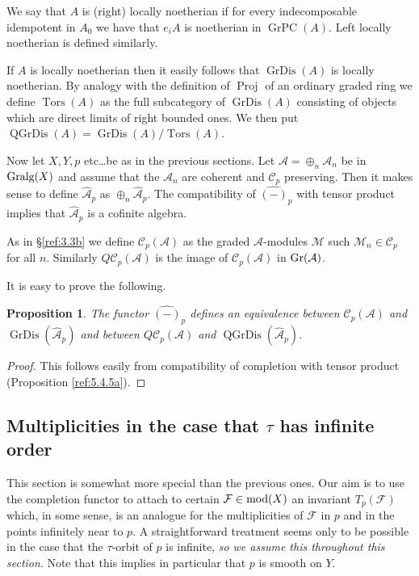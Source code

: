 \documentclass{amsproc}
\def\Ascr{{\mathcal A}}
\def\Cscr{{\mathcal C}}
\def\Fscr{{\mathcal F}}
\def\Mscr{{\mathcal M}}
\def\mod{\mathop{\text{mod}}}
\def\Gr{\mathop{\text{Gr}}}
\def\Gralg{\mathop{\text{Gralg}}}
\def\Tors{\operatorname{Tors}}
\def\Proj{\operatorname {Proj}}
\def\Tors{\operatorname {Tors}}
\let\oldtext\text
\def\text#1{\oldtext{\upshape #1}}
\DeclareMathOperator{\GrPC}{GrPC}
\DeclareMathOperator{\GrDis}{GrDis}
\DeclareMathOperator{\QGrDis}{QGrDis}
\newtheorem{propositions}[lemmas]{Proposition}
\theoremstyle{definition}
\theoremstyle{remark}
\numberwithin{equation}{section}
\numberwithin{table}{section}
\numberwithin{figure}{section}
\def\Gr{\mathop{\text{Gr}}}
\begin{document}
We say that $A$ is (right) locally noetherian if for every indecomposable
idempotent in $A_0$ we have that $e_iA$ is noetherian in $\GrPC(A)$. Left
locally noetherian is defined similarly.

If $A$ is locally
noetherian then it easily follows that $\GrDis(A)$ is locally noetherian.
 By analogy with the definition
of $\Proj$ of an ordinary graded ring we define $\Tors(A)$ as the full
subcategory of $\GrDis(A)$ consisting of objects which are direct
limits of right bounded ones. We then put
$\QGrDis(A)=\GrDis(A)/\Tors(A)$. 


Now let $X,Y,p$ etc\dots be as in the previous sections. Let
$\Ascr=\oplus_n \Ascr_n$ be  in $\Gralg(X)$ and
assume that the $\Ascr_n$ are coherent and $\Cscr_p$ preserving. Then
it makes sense to define $\hat{\Ascr}_p$ as $\oplus_n
\hat{\Ascr}_p$. The compatibility of $\hat{(-)}_p$ with tensor product
implies that $\hat{\Ascr}_p$ is a cofinite algebra.

As in \S\ref{ref:3.3b} we define $\Cscr_{p}(\Ascr)$ as the graded
$\Ascr$-modules $\Mscr$ such $\Mscr_n\in\Cscr_p$ for all $n$.
Similarly $Q\Cscr_p(\Ascr)$ is the image of $\Cscr_p(\Ascr)$ in
$\Gr(\Ascr)$.

 It is easy to prove the following. 
\begin{propositions} 
\label{ref:5.6.2a}
The functor $\hat{(-)}_p$ defines an  equivalence
  between $\Cscr_p(\Ascr)$ and $\GrDis(\hat{\Ascr}_p)$ and between
  $Q\Cscr_p(\Ascr)$ and $\QGrDis(\hat{\Ascr}_p)$.
\end{propositions}
\begin{proof} This follows easily from 
  compatibility of completion with tensor product (Proposition
  \ref{ref:5.4.5a}). 
\end{proof}
 
\subsection{Multiplicities in the case that $\tau$ has infinite order} \label{ref:5.7b}
This section is somewhat more special than the previous ones. Our aim
is to use the completion functor to attach to certain
$\Fscr\in\mod(X)$ an invariant $T_p(\Fscr)$ which, in some sense, is
an analogue for the multiplicities of $\Fscr$ in $p$ and in the points
infinitely near to $p$. 
  A straightforward treatment seems
only to be possible in the case that the $\tau$-orbit of $p$ is
infinite, \emph{so we assume this throughout this section}. Note that
 this implies in particular that $p$ is
smooth on $Y$.
\end{document}
